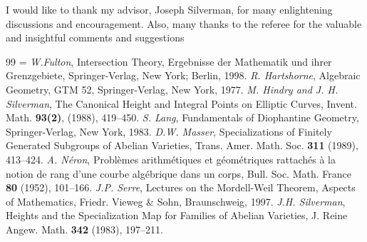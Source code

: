 \documentclass[12pt,reqno]{amsart}
\begin{document}
\begin{acknowledgement}
I would like to thank my advisor, Joseph Silverman, for many enlightening discussions and encouragement. Also, many thanks to the referee for the valuable and insightful comments and suggestions
\end{acknowledgement}



\begin{thebibliography}{99}
\itemsep=\smallskipamount
\textit{W.Fulton}, Intersection Theory,	Ergebnisse der Mathematik und ihrer Grenzgebiete, Springer-Verlag, New York; Berlin, 1998.
\textit{R. Hartshorne}, Algebraic Geometry, GTM 52, Springer-Verlag, New York, 1977.
\textit{M. Hindry and J. H. Silverman}, The Canonical Height and Integral Points on Elliptic Curves, Invent. Math. \textbf{93(2)}, (1988), 419--450.
\textit{S. Lang}, Fundamentals of Diophantine Geometry, Springer-Verlag, New York, 1983.
\textit{D.W. Masser}, Specializations of Finitely Generated Subgroups of Abelian Varieties, Trans. Amer. Math. Soc. \textbf{311} (1989), 413--424.
\textit{A. N\'eron}, Probl\`emes arithm\'etiques et g\'eom\'etriques rattach\'es à la notion de rang d'une courbe alg\'ebrique dans un corps,  Bull. Soc. Math. France \textbf{80} (1952), 101--166.
\textit{J.P. Serre}, Lectures on the Mordell-Weil Theorem, Aspects of Mathematics, Friedr. Vieweg \& Sohn, Braunschweig, 1997.
\textit{J.H. Silverman}, Heights and the Specialization Map for Families of Abelian Varieties, J. Reine Angew. Math. \textbf{342} (1983), 197--211.

\end{thebibliography}
\end{document}
